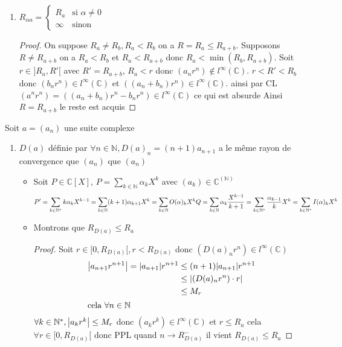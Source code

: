 \documentclass[11pt,hidelinks]{book}
\theoremstyle{mytheoremstyle}
\theoremstyle{mytheoremstyle}
\theoremstyle{mytheoremstyle}
\theoremstyle{mytheoremstyle}
\theoremstyle{mytheoremstyle}
\theoremstyle{mytheoremstyle}
\theoremstyle{mytheoremstyle}
\theoremstyle{mytheoremstyle}
\theoremstyle{myproblemstyle}
\def\mbb#1{\mathbb{#1}}
\def\bN{\mbb{N}}
\def\bC{\mbb{C}}
\def\born{l^{\infty}\left( \bC \right)}
\newcommand{\deq}[3]{\begin{cases}
    #1 & \text{si } #2 \\
    #3 & \text{sinon}
\end{cases}}
\begin{document}
\begin{adjustwidth}{-2em}{-1em}
\begin{prop}
\begin{enumerate}
        \item $R_{\alpha a} = \deq{R_a}{\alpha \not = 0}{\infty}$
        \begin{proof}
            On suppose $R_a \not = R_b, R_a < R_b$ on a $R = R_a \leq R_{a+b}$.
            Supposons $R \not= R_{a+b}$ on a $R_a < R_b$ et $R_a < R_{a+b}$ donc $R_a < \min(R_b, R_{a+b})$.
            Soit $r \in ]R_a,R'[$  avec $R' = R_{a+b}$, $R_a < r$ donc $(a_nr^n) \not\in \born$.
            $r < R' < R_b$ donc $(b_nr^n) \in \born$ et $((a_n + b_n) r^n) \in \born$.
            ainsi par CL $(a^nr^n) = ((a_n + b_n)r^n - b_nr^n) \in \born$ ce qui est absurde
            Ainsi $R = R_{a+b}$     
            le reste est acquis
        \end{proof}
    \end{enumerate}
    \end{prop}
    \begin{prop}
        Soit $a = (a_n)$ une suite complexe
        \begin{enumerate}  
        \item $D(a)$ définie par $\forall n \in \bN, D(a)_n = (n+1)a_{n+1}$ a le même rayon de convergence que $(a_n)$
        que $(a_n)$
            \begin{itemize}
            \item \begin{rmq}
                Soit $P \in \bC[X]$, $P = \sum_{k \in \bN} \alpha_k X^k$ avec $(a_k) \in \bC^{\left(\bN\right)}$ 
                \begin{equation*}
                P' = \sum_{k \in \bN^*} k \alpha_k X^{k-1} = \sum_{k \in \bN} (k+1) \alpha_{k+1} X^k = \sum_{k \in \bN} O(\alpha)_k X^k \\
                Q = \sum_{k \in \bN} \alpha_k \frac{X^{k-1}}{k+1} = \sum_{k \in \bN^*} \frac{\alpha_{k-1}}{k} X^k = \sum_{k \in \bN^*} I(\alpha)_k X^k
                \end{equation*}
            \end{rmq}
            \item Montrons que $R_{D(a)} \leq R_a$ 
            \begin{proof}
            Soit $r \in [0, R_{D(a)}[, r < R_{D(a)}$ donc $(D(a)_n r^n) \in \born$
            \begin{align*}
                \abs{a_{n+1} r^{n+1}} = \abs{a_{n+1}} r^{n+1} &\leq (n+1)\abs{a_{n+1}} r^{n+1} \\ 
                                                              &\leq \abs{(D(a)_n r^n) \cdot r} \\
                                                              &\leq M_r \\
            \intertext{cela $\forall n \in \bN$}
                    \end{align*}
            $\forall k \in \bN^*, \abs{a_k r^k} \leq M_r$ donc $(a_k r^k) \in \born$ et $r \leq R_a$ 
            cela $\forall r \in [0,R_{D(a)}[$ 
            donc PPL quand $n \to R_{D(a)}^-$ il vient $R_{D(a)} \leq R_a$
                \end{proof}
            

\end{itemize}
\end{enumerate}
\end{prop}
\end{adjustwidth}
\end{document}
